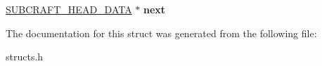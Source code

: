 \begin{DoxyCompactItemize}
\item 
\hypertarget{structsubcraft__head__data_a8b3b1e4887e79d36c253b469ca51c656}{\hyperlink{structsubcraft__head__data}{S\-U\-B\-C\-R\-A\-F\-T\-\_\-\-H\-E\-A\-D\-\_\-\-D\-A\-T\-A} $\ast$ {\bfseries next}}\label{structsubcraft__head__data_a8b3b1e4887e79d36c253b469ca51c656}

\end{DoxyCompactItemize}


The documentation for this struct was generated from the following file\-:\begin{DoxyCompactItemize}
\item 
structs.\-h\end{DoxyCompactItemize}
